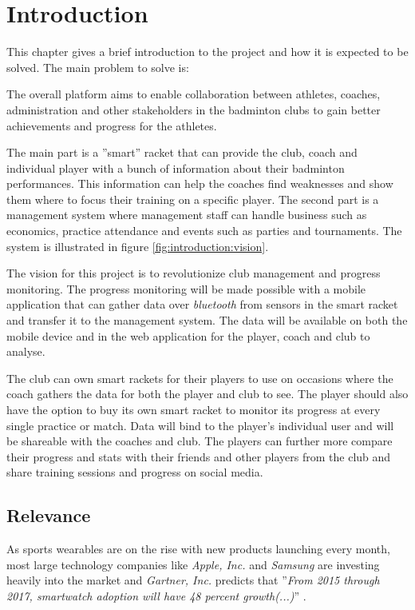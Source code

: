 \chapter{Introduction}
This chapter gives a brief introduction to the project and how it is expected to be solved.
The main problem to solve is:


The overall platform aims to enable collaboration between athletes, coaches, administration and other stakeholders in the badminton clubs to gain better achievements and progress for the athletes.

The main part is a ''smart'' racket that can provide the club, coach and individual player with a bunch of information about their badminton performances.
This information can help the coaches find weaknesses and show them where to focus their training on a specific player.
The second part is a management system where management staff can handle business such as economics, practice attendance and events such as parties and tournaments.
The system is illustrated in figure \ref{fig:introduction:vision}.


The vision for this project is to revolutionize club management and progress monitoring.
The progress monitoring will be made possible with a mobile application that can gather data over \textit{\gls{bluetooth}} from sensors in the smart racket and transfer it to the management system.
The data will be available on both the mobile device and in the web application for the player, coach and club to analyse.

The club can own smart rackets for their players to use on occasions where the coach gathers the data for both the player and club to see.
The player should also have the option to buy its own smart racket to monitor its progress at every single practice or match.
Data will bind to the player's individual user and will be shareable with the coaches and club.
The players can further more compare their progress and stats with their friends and other players from the club and share training sessions and progress on social media.

\section*{Relevance}
As sports wearables are on the rise with new products launching every month, most large technology companies like \textit{Apple, Inc.} and \textit{Samsung} are investing heavily into the market and \textit{Gartner, Inc.} predicts that ''\textit{From 2015 through 2017, smartwatch adoption will have 48 percent growth(...)}'' \citep{introduction:relevance:gartner}.

